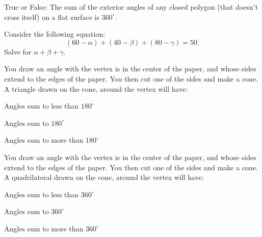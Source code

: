 \documentclass[noauthor,nooutcomes]{ximera}
\author{Claire Merriman \and Bart Snapp}
\begin{document}
\maketitle

\begin{exercise}
 True or False: The sum of the exterior angles of any closed polygon
 (that doesn't cross itself) on a flat surface is $360^\circ$.
\end{exercise}

\begin{exercise}
 Consider the following equation:
 \[
 (60-\alpha)+(40-\beta)+(80-\gamma)=50.
 \]
 Solve for $\alpha+\beta+\gamma$.
\end{exercise}






\begin{exercise}
 You draw an angle with the vertex is in the center of the paper, and
 whose sides extend to the edges of the paper. You then cut one of the
 sides and make a cone. A triangle drawn on the cone, around the
 vertex will have:
 
\begin{enumerate}
\begin{multicols}{3}
 \item Angles sum to less than $180^\circ$
 \item Angles sum to $180^\circ$
 \item Angles sum to more than $180^\circ$
\end{multicols}
\end{enumerate}
\end{exercise}


\begin{exercise}
 You draw an angle with the vertex is in the center of the paper, and
 whose sides extend to the edges of the paper. You then cut one of the
 sides and make a cone. A quadrilateral drawn on the cone, around the
 vertex will have:
 
\begin{enumerate}
\begin{multicols}{3}
 \item Angles sum to less than $360^\circ$
 \item Angles sum to $360^\circ$
 \item Angles sum to more than $360^\circ$
\end{multicols}
\end{enumerate}
\end{exercise}
\end{document}
